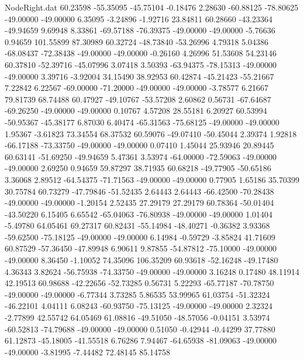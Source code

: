 \begin{filecontents}{NodeRight.dat}
  60.23598  -55.35095  -45.75104    -0.18476    2.28630  -60.88125  -78.80625  -49.00000  -49.00000    6.35095   -3.24896   -1.92716   23.84811
  60.28660  -43.23364  -49.94659     9.69948    8.33861  -69.57188  -76.39375  -49.00000  -49.00000   -5.76636    0.94659  101.55899   87.30989
  60.32724  -48.73840  -53.26996     4.79318    5.04386  -68.08437  -72.38438  -49.00000  -49.00000   -0.26160    4.26996   51.53608   54.23146
  60.37810  -52.39716  -45.07996     3.07418    3.50393  -63.94375  -78.15313  -49.00000  -49.00000    3.39716   -3.92004   34.15490   38.92953
  60.42874  -45.21423  -55.21667     7.22842    6.22567  -69.00000  -71.20000  -49.00000  -49.00000   -3.78577    6.21667   79.81739   68.74488
  60.47927  -49.10767  -53.57208     2.60862    0.56731  -67.64687  -69.26250  -49.00000  -49.00000    0.10767    4.57208   28.55181    6.20927
  60.53994  -50.95367  -45.38177     6.87030    6.40474  -65.31563  -75.68125  -49.00000  -49.00000    1.95367   -3.61823   73.34554   68.37532
  60.59076  -49.07410  -50.45044     2.39374    1.92818  -66.17188  -73.33750  -49.00000  -49.00000    0.07410    1.45044   25.93946   20.89445
  60.63141  -51.69250  -49.94659     5.47361    3.53974  -64.00000  -72.59063  -49.00000  -49.00000    2.69250    0.94659   59.87297   38.71935
  60.68218  -49.77905  -50.65186     3.36068    2.89512  -64.54375  -71.71563  -49.00000  -49.00000    0.77905    1.65186   35.70399   30.75784
  60.73279  -47.79846  -51.52435     2.64443    2.64443  -66.42500  -70.28438  -49.00000  -49.00000   -1.20154    2.52435   27.29179   27.29179
  60.78364  -50.01404  -43.50220     6.15405    6.65542  -65.04063  -76.80938  -49.00000  -49.00000    1.01404   -5.49780   64.05461   69.27317
  60.82431  -55.14984  -48.40271    -0.36382    3.93368  -59.62500  -75.18125  -49.00000  -49.00000    6.14984   -0.59729   -3.85824   41.71609
  60.87529  -57.36450  -47.89948     6.90611    9.87855  -54.87812  -75.10000  -49.00000  -49.00000    8.36450   -1.10052   74.35096  106.35209
  60.93618  -52.16248  -49.17480     4.36343    3.82624  -56.75938  -74.33750  -49.00000  -49.00000    3.16248    0.17480   48.11914   42.19513
  60.98688  -42.22656  -52.73285     0.56731    5.22293  -65.77187  -70.78750  -49.00000  -49.00000   -6.77344    3.73285    5.86535   53.99965
  61.03754  -51.32324  -46.22101     4.04111    6.08243  -60.93750  -75.13125  -49.00000  -49.00000    2.32324   -2.77899   42.55742   64.05469
  61.08816  -49.51050  -48.57056    -0.04151    3.53974  -60.52813  -74.79688  -49.00000  -49.00000    0.51050   -0.42944   -0.44299   37.77880
  61.12873  -45.18005  -41.55518     6.76286    7.94467  -64.65938  -81.09063  -49.00000  -49.00000   -3.81995   -7.44482   72.48145   85.14758

\end{filecontents}
